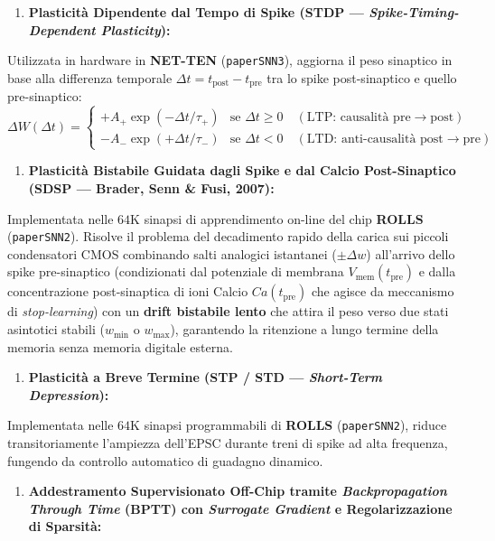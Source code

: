 \documentclass[11pt,a4paper]{article}
\begin{document}
\begin{enumerate}
  \item \textbf{Plasticità Dipendente dal Tempo di Spike (STDP --- \textit{Spike-Timing-Dependent Plasticity}):}
\end{enumerate}
Utilizzata in hardware in \textbf{NET-TEN} (\texttt{paperSNN3}), aggiorna il peso sinaptico in base alla differenza temporale $\Delta t = t_{\text{post}} - t_{\text{pre}}$ tra lo spike post-sinaptico e quello pre-sinaptico:
\[
\Delta W(\Delta t) = \begin{cases} +A_+ \exp(-\Delta t / \tau_+) & \text{se } \Delta t \ge 0 \quad (\text{LTP: causalità pre}\to\text{post}) \\ -A_- \exp(+\Delta t / \tau_-) & \text{se } \Delta t < 0 \quad (\text{LTD: anti-causalità post}\to\text{pre}) \end{cases}
\]
\begin{enumerate}
  \item \textbf{Plasticità Bistabile Guidata dagli Spike e dal Calcio Post-Sinaptico (SDSP --- Brader, Senn \& Fusi, 2007):}
\end{enumerate}
Implementata nelle $64\text{K}$ sinapsi di apprendimento on-line del chip \textbf{ROLLS} (\texttt{paperSNN2}). Risolve il problema del decadimento rapido della carica sui piccoli condensatori CMOS combinando salti analogici istantanei ($\pm \Delta w$) all'arrivo dello spike pre-sinaptico (condizionati dal potenziale di membrana $V_{\text{mem}}(t_{\text{pre}})$ e dalla concentrazione post-sinaptica di ioni Calcio $Ca(t_{\text{pre}})$ che agisce da meccanismo di \textit{stop-learning}) con un \textbf{drift bistabile lento} che attira il peso verso due stati asintotici stabili ($w_{\min}$ o $w_{\max}$), garantendo la ritenzione a lungo termine della memoria senza memoria digitale esterna.
\begin{enumerate}
  \item \textbf{Plasticità a Breve Termine (STP / STD --- \textit{Short-Term Depression}):}
\end{enumerate}
Implementata nelle $64\text{K}$ sinapsi programmabili di \textbf{ROLLS} (\texttt{paperSNN2}), riduce transitoriamente l'ampiezza dell'EPSC durante treni di spike ad alta frequenza, fungendo da controllo automatico di guadagno dinamico.
\begin{enumerate}
  \item \textbf{Addestramento Supervisionato Off-Chip tramite \textit{Backpropagation Through Time} (BPTT) con \textit{Surrogate Gradient} e Regolarizzazione di Sparsità:}
\end{enumerate}
\end{document}

